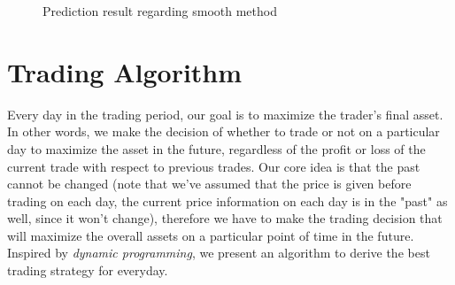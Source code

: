 \documentclass{mcmthesis}
\begin{document}
\begin{figure}[htb]
\centering
{}
\caption{Prediction result regarding smooth method}
\label{fig:prediction result}
\end{figure}

\section{Trading Algorithm}
Every day in the trading period, our goal is to maximize the trader's final asset. In other words, we make the decision of whether to trade or not on a particular day to maximize the asset in the future, regardless of the profit or loss of the current trade with respect to previous trades. Our core idea is that the past cannot be changed (note that we've assumed that the price is given before trading on each day, the current price information on each day is in the "past" as well, since it won't change), therefore we have to make the trading decision that will maximize the overall assets on a particular point of time in the future. Inspired by \emph{dynamic programming}, we present an algorithm to derive the best trading strategy for everyday. 
\end{document}
